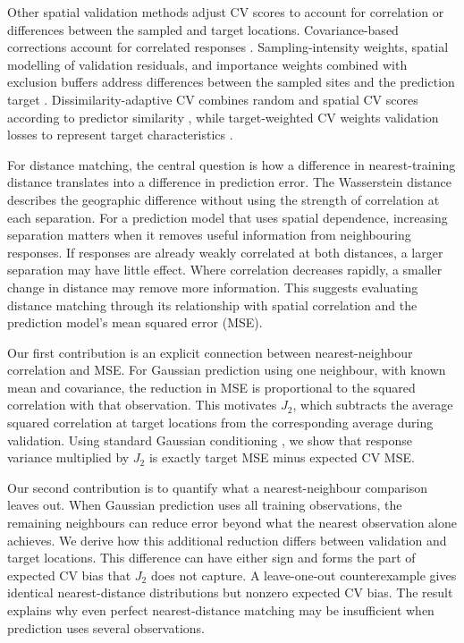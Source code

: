 Other spatial validation methods adjust CV scores to account for correlation or differences between the sampled and target locations. Covariance-based corrections account for correlated responses \citep{rabinowicz2022correlated,yuval2025classification}. Sampling-intensity weights, spatial modelling of validation residuals, and importance weights combined with exclusion buffers address differences between the sampled sites and the prediction target \citep{debruin2022clustered,wang2023geospatial}. Dissimilarity-adaptive CV combines random and spatial CV scores according to predictor similarity \citep{wang2025dissimilarity}, while target-weighted CV weights validation losses to represent target characteristics \citep{brenning2026targetweighted}.

For distance matching, the central question is how a difference in nearest-training distance translates into a difference in prediction error. The Wasserstein distance describes the geographic difference without using the strength of correlation at each separation. For a prediction model that uses spatial dependence, increasing separation matters when it removes useful information from neighbouring responses. If responses are already weakly correlated at both distances, a larger separation may have little effect. Where correlation decreases rapidly, a smaller change in distance may remove more information. This suggests evaluating distance matching through its relationship with spatial correlation and the prediction model's mean squared error (MSE).

Our first contribution is an explicit connection between nearest-neighbour correlation and MSE. For Gaussian prediction using one neighbour, with known mean and covariance, the reduction in MSE is proportional to the squared correlation with that observation. This motivates $J_2$, which subtracts the average squared correlation at target locations from the corresponding average during validation. Using standard Gaussian conditioning \citep{rasmussen2006gpml}, we show that response variance multiplied by $J_2$ is exactly target MSE minus expected CV MSE.

Our second contribution is to quantify what a nearest-neighbour comparison leaves out. When Gaussian prediction uses all training observations, the remaining neighbours can reduce error beyond what the nearest observation alone achieves. We derive how this additional reduction differs between validation and target locations. This difference can have either sign and forms the part of expected CV bias that $J_2$ does not capture. A leave-one-out counterexample gives identical nearest-distance distributions but nonzero expected CV bias. The result explains why even perfect nearest-distance matching may be insufficient when prediction uses several observations.

